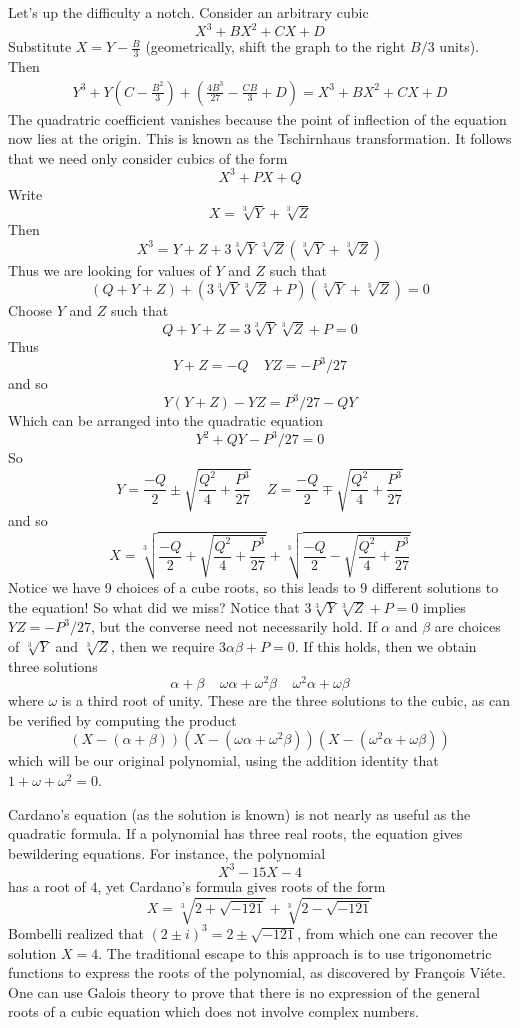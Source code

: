 Let's up the difficulty a notch. Consider an arbitrary cubic
%
\[ X^3 + BX^2 + CX + D \]
%
Substitute $X = Y - \frac{B}{3}$ (geometrically, shift the graph to the right $B/3$ units). Then
%
\begin{align*}
   Y^3 + Y\left(C - \frac{B^2}{3}\right) + \left( \frac{4B^3}{27} - \frac{CB}{3} + D \right) = X^3 + BX^2 + CX + D
\end{align*}
%
The quadratric coefficient vanishes because the point of inflection of the equation now lies at the origin. This is known as the Tschirnhaus transformation. It follows that we need only consider cubics of the form
%
\[ X^3 + PX + Q \]
%
Write
%
\[ X = \sqrt[3]{Y} + \sqrt[3]{Z} \]
%
Then
%
\[ X^3 = Y + Z + 3\sqrt[3]{Y}\sqrt[3]{Z}(\sqrt[3]{Y} + \sqrt[3]{Z}) \]
%
Thus we are looking for values of $Y$ and $Z$ such that
%
\[ (Q + Y + Z) + (3\sqrt[3]{Y}\sqrt[3]{Z} + P)(\sqrt[3]{Y} + \sqrt[3]{Z}) = 0 \]
%
Choose $Y$ and $Z$ such that
%
\[ Q + Y + Z = 3 \sqrt[3]{Y}\sqrt[3]{Z} + P = 0 \]
%
Thus
%
\[ Y + Z = -Q\ \ \ \ \ YZ = -P^3/27 \]
%
and so
%
\[ Y(Y + Z) - YZ = P^3/27 - QY \]
%
Which can be arranged into the quadratic equation
%
\[ Y^2 + QY - P^3/27 = 0 \]
%
So
%
\[ Y = \frac{-Q}{2} \pm \sqrt{\frac{Q^2}{4} + \frac{P^3}{27}}\ \ \ \ \ Z = \frac{-Q}{2} \mp \sqrt{\frac{Q^2}{4} + \frac{P^3}{27}} \]
%
and so
%
\[ X = \sqrt[3]{\frac{-Q}{2} + \sqrt{\frac{Q^2}{4} + \frac{P^3}{27}}} + \sqrt[3]{\frac{-Q}{2} - \sqrt{\frac{Q^2}{4} + \frac{P^3}{27}}} \]
%
Notice we have 9 choices of a cube roots, so this leads to 9 different solutions to the equation! So what did we miss? Notice that $3\sqrt[3]{Y}\sqrt[3]{Z} + P = 0$ implies $YZ = -P^3/27$, but the converse need not necessarily hold. If $\alpha$ and $\beta$ are choices of $\sqrt[3]{Y}$ and $\sqrt[3]{Z}$, then we require $3\alpha\beta + P = 0$. If this holds, then we obtain three solutions
%
\[ \alpha + \beta\ \ \ \ \ \omega \alpha + \omega^2 \beta\ \ \ \ \ \omega^2 \alpha + \omega \beta \]
%
where $\omega$ is a third root of unity. These are the three solutions to the cubic, as can be verified by computing the product
%
\[ (X - (\alpha + \beta))(X - (\omega \alpha + \omega^2 \beta)) (X - (\omega^2 \alpha + \omega \beta)) \]
%
which will be our original polynomial, using the addition identity that $1 + \omega + \omega^2 = 0$.

Cardano's equation (as the solution is known) is not nearly as useful as the quadratic formula. If a polynomial has three real roots, the equation gives bewildering equations. For instance, the polynomial
%
\[  X^3 - 15X - 4 \]
%
has a root of $4$, yet Cardano's formula gives roots of the form
%
\[ X = \sqrt[3]{2 + \sqrt{-121}} + \sqrt[3]{2 - \sqrt{-121}} \]
%
Bombelli realized that $(2 \pm i)^3 = 2 \pm \sqrt{-121}$, from which one can recover the solution $X = 4$. The traditional escape to this approach is to use trigonometric functions to express the roots of the polynomial, as discovered by Fran\c{c}ois Vi\'{e}te. One can use Galois theory to prove that there is no expression of the general roots of a cubic equation which does not involve complex numbers.

